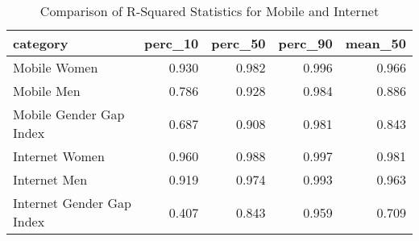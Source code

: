 \begin{table}[ht]
\centering
\begin{tabular}{lrrrr}
  \hline
category & perc\_10 & perc\_50 & perc\_90 & mean\_50 \\ 
  \hline
Mobile Women & 0.930 & 0.982 & 0.996 & 0.966 \\ 
  Mobile Men & 0.786 & 0.928 & 0.984 & 0.886 \\ 
  Mobile Gender Gap Index & 0.687 & 0.908 & 0.981 & 0.843 \\ 
  Internet Women & 0.960 & 0.988 & 0.997 & 0.981 \\ 
  Internet Men & 0.919 & 0.974 & 0.993 & 0.963 \\ 
  Internet Gender Gap Index & 0.407 & 0.843 & 0.959 & 0.709 \\ 
   \hline
\end{tabular}
\caption{Comparison of R-Squared Statistics for Mobile and Internet} 
\label{tab:stats_comparison}
\end{table}
